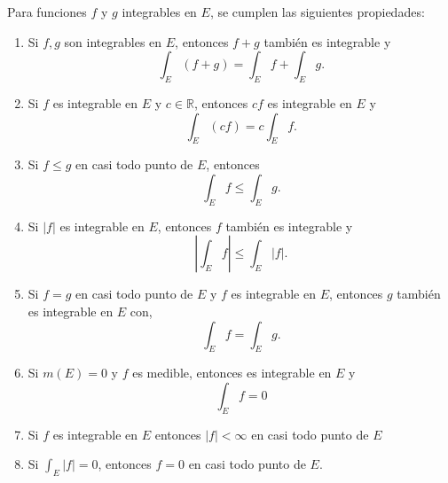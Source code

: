 \begin{proposición}
Para funciones $f$ y $g$ integrables en $E$, se cumplen las siguientes propiedades:
\vspace{-0.5em}
\begin{enumerate}
    \item Si $f, g$ son integrables en $E$, entonces $f+g$ también es integrable y $$
              \int_E (f+g) = \int_E f + \int_E g. $$

    \item Si $f$ es integrable en $E$ y $c \in \mathbb{R}$, entonces $cf$ es integrable
          en $E$ y $$ \int_E (cf) = c \int_E f. $$

    \item Si $f \leq g$ en casi todo punto de $E$, entonces $$ \int_E f \leq \int_E g. $$

    \item Si $|f|$ es integrable en $E$, entonces $f$ también es integrable y $$ \left|
              \int_E f \right| \leq \int_E |f|. $$

    \item Si $f = g$ en casi todo punto de $E$ y $f$ es integrable en $E$, entonces $g$
          también es integrable en $E$ con, $$ \int_E f = \int_E g. $$

    \item Si $m(E) = 0$ y $f$ es medible, entonces es integrable en $E$ y $$ \int_E f = 0
          $$

    \item Si $f$ es integrable en $E$ entonces $|f| < \infty$ en casi todo punto de $E$

    \item Si $\int_E |f| = 0$, entonces $f = 0$ en casi todo punto de $E$.
\end{enumerate}
\end{proposición}
